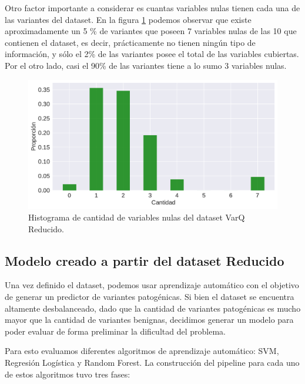 Otro factor importante a considerar es cuantas variables nulas tienen cada una de las variantes del dataset. En la figura \ref{fig:nulos_varq} podemos observar que existe aproximadamente un 5 \% de variantes que poseen 7 variables nulas de las 10 que contienen el dataset, es decir, prácticamente no tienen ningún tipo de información, y sólo el 2\% de las variantes posee el total de las variables cubiertas. Por el otro lado, casi el 90\% de las variantes tiene a lo sumo 3 variables nulas.

\begin{figure}[h]
    \centering
    \includegraphics[scale=0.55]{documents/latex/figures/3/nulos_varq.pdf}
    \caption{Histograma de cantidad de variables nulas del dataset VarQ Reducido.}
    \label{fig:nulos_varq}
\end{figure}

\subsection{Modelo creado a partir del dataset Reducido}

Una vez definido el dataset, podemos usar aprendizaje automático con el objetivo de generar un predictor de variantes patogénicas. Si bien el dataset se encuentra altamente desbalanceado, dado que la cantidad de variantes patogénicas es mucho mayor que la cantidad de variantes benignas, decidimos generar un modelo para poder evaluar de forma preliminar la dificultad del problema. 

Para esto evaluamos diferentes algoritmos de aprendizaje automático: SVM, Regresión Logística y Random Forest. La construcción del pipeline para cada uno de estos algoritmos tuvo tres fases: 

